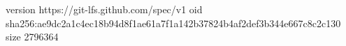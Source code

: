 version https://git-lfs.github.com/spec/v1
oid sha256:ae9dc2a1c4ec18b94d8f1ae61a7f1a142b37824b4af2def3b344e667c8c2c130
size 2796364
